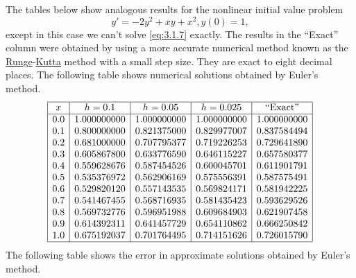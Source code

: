 \documentclass{ximera}
\begin{document}
 

 
 
 \begin{example}\label{example:3.1.3}
The tables below show analogous results
for the nonlinear initial value problem
\begin{equation} \label{eq:3.1.7}
y'=-2y^2+xy+x^2, y(0)=1,
\end{equation}
except in this case we can't solve \eqref{eq:3.1.7} exactly.
The results in the ``Exact'' column were obtained by using a
more accurate numerical method known as the
\href{http://www-history.mcs.st-and.ac.uk/Mathematicians/Runge.html}{Runge}-\href{http://www-history.mcs.st-and.ac.uk/Mathematicians/Kutta.html}{Kutta}
method
 with a small step size. They are
exact to eight decimal places.
The following table shows numerical solutions obtained by Euler's method.
$$
\begin{array}{|c|c|c|c|c|}
\hline
x&
h=0.1&
h=0.05&
h=0.025&
\text{``Exact''}\\ \hline
0.0 & 1.000000000 & 1.000000000 & 1.000000000 & 1.000000000 \\
0.1 & 0.800000000 & 0.821375000 & 0.829977007 & 0.837584494 \\
0.2 & 0.681000000 & 0.707795377 & 0.719226253 & 0.729641890 \\
0.3 & 0.605867800 & 0.633776590 & 0.646115227 & 0.657580377 \\
0.4 & 0.559628676 & 0.587454526 & 0.600045701 & 0.611901791 \\
0.5 & 0.535376972 & 0.562906169 & 0.575556391 & 0.587575491 \\
0.6 & 0.529820120 & 0.557143535 & 0.569824171 & 0.581942225 \\
0.7 & 0.541467455 & 0.568716935 & 0.581435423 & 0.593629526 \\
0.8 & 0.569732776 & 0.596951988 & 0.609684903 & 0.621907458 \\
0.9 & 0.614392311 & 0.641457729 & 0.654110862 & 0.666250842 \\
1.0 & 0.675192037 & 0.701764495 & 0.714151626 & 0.726015790\\
\hline
\end{array}
$$
The following table shows the error in approximate solutions obtained by Euler's method.
$$
\begin{array}{|c|c|c|c|}

\end{array}$$
\end{example}
\end{document}
